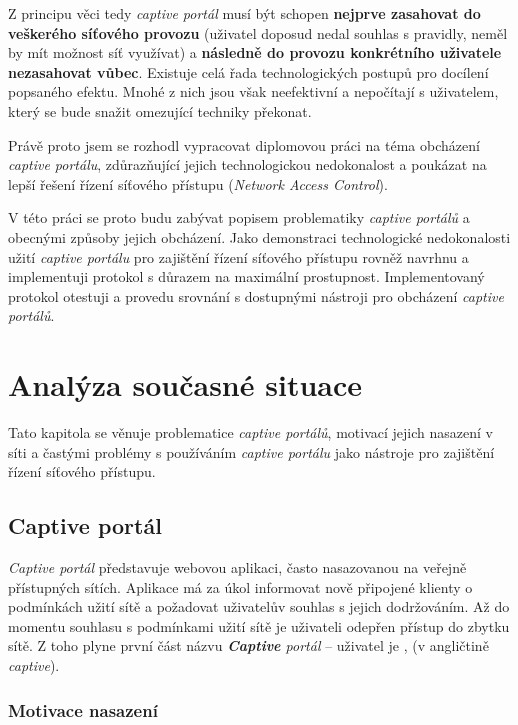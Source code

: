 \documentclass[thesis=M,czech]{FITthesis}[2012/10/20]
\begin{document}
\begin{introduction}
Z principu věci tedy \textit{captive portál} musí být schopen \textbf{nejprve zasahovat do veškerého síťového provozu} (uživatel doposud nedal souhlas s pravidly, neměl by mít možnost síť využívat) a \textbf{následně do provozu konkrétního uživatele nezasahovat vůbec}. Existuje celá řada technologických postupů pro docílení popsaného efektu. Mnohé z nich jsou však neefektivní a nepočítají s  uživatelem, který se bude snažit omezující techniky překonat.

Právě proto jsem se rozhodl vypracovat diplomovou práci na téma obcházení \textit{captive portálu}, zdůrazňující jejich technologickou nedokonalost a poukázat na lepší řešení řízení síťového přístupu (\textit{Network Access Control}).

V této práci se proto budu zabývat popisem problematiky \textit{captive portálů} a obecnými způsoby jejich obcházení. Jako demonstraci technologické nedokonalosti užití \textit{captive portálu} pro zajištění řízení síťového přístupu rovněž navrhnu a implementuji protokol s důrazem na maximální prostupnost. Implementovaný protokol otestuji a provedu srovnání s dostupnými nástroji pro obcházení \textit{captive portálů}.
\end{introduction}

\chapter{Analýza současné situace}

Tato kapitola se věnuje problematice \textit{captive portálů}, motivací jejich nasazení v síti a častými problémy s používáním \textit{captive portálu} jako nástroje pro zajištění řízení síťového přístupu.

\section{Captive portál}

\textit{Captive portál} představuje webovou aplikaci, často nasazovanou na veřejně přístupných sítích. Aplikace má za úkol informovat nově připojené klienty o podmínkách užití sítě a požadovat uživatelův souhlas s jejich dodržováním. Až do momentu souhlasu s podmínkami užití sítě je uživateli odepřen přístup do zbytku sítě. Z toho plyne první část názvu \textit{\textbf{Captive} portál} -- uživatel je ,  (v angličtině \textit{captive}).

\subsection{Motivace nasazení}
\end{document}
